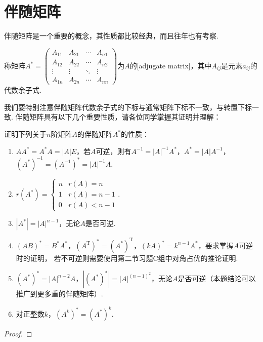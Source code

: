 \section{伴随矩阵}
伴随矩阵是一个重要的概念，其性质都比较经典，而且往年也有考察.
\begin{definition}
    称矩阵$A^*=\begin{pmatrix}
        A_{11} & A_{21} & \cdots & A_{n1} \\
        A_{12} & A_{22} & \cdots & A_{n2} \\
        \vdots & \vdots & \ddots & \vdots \\
        A_{1n} & A_{2n} & \cdots & A_{nn}
    \end{pmatrix}$为$A$的[adjugate matrix]，其中$A_{ij}$是元素$a_{ij}$的代数余子式.
\end{definition}
我们要特别注意伴随矩阵代数余子式的下标与通常矩阵下标不一致，与转置下标一致.
伴随矩阵具有以下几个重要性质，请各位同学掌握其证明并理解：
\begin{example} \label{ex:11:伴随矩阵}
    证明下列关于$n$阶矩阵$A$的伴随矩阵$A^*$的性质：
    \begin{enumerate}
        \item $AA^*=A^*A=|A|E$，若$A$可逆，则有$A^{-1}=|A|^{-1}A^*$，$A^*=|A|A^{-1}$，$(A^*)^{-1}=(A^{-1})^*=|A|^{-1}A$.

        \item $r(A^*)=\begin{cases}
        n & r(A)=n \\ 1 & r(A)=n-1 \\ 0 & r(A) < n-1
    \end{cases}$.

        \item $|A^*|=|A|^{n-1}$，无论$A$是否可逆.

        \item $(AB)^*=B^*A^*$，$(A^\mathrm{T})^*=(A^*)^\mathrm{T}$，$(kA)^*=k^{n-1}A^*$，要求掌握$A$可逆时的证明，
        若不可逆则需要使用第二节习题C组中对角占优的推论证明.

        \item $(A^*)^*=|A|^{n-2}A$，$|(A^*)^*|=|A|^{(n-1)^2}$，无论$A$是否可逆（本题结论可以推广到更多重的伴随矩阵）.

        \item 对正整数$k$，$(A^k)^*=(A^*)^k$.
    \end{enumerate}
\end{example}
\begin{proof}
    
\end{proof}

